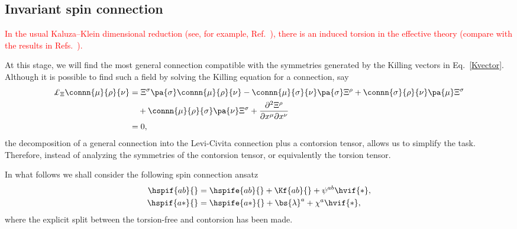 \documentclass[aps,prd,12pt,superscriptaddress,showpacs,showkeys,reprint]{revtex4-1}
\begin{document}
\subsection*{Invariant spin connection}

\textcolor{red}{In the usual Kaluza--Klein dimensional reduction (see, for example, Ref.~\cite{PopeKK}), there is an induced torsion in the effective theory (compare with the results in Refs.~\cite{PhysRevD.17.3141,PhysRevD.19.430}).}

At this stage, we will find the most general connection compatible with the symmetries generated by the Killing vectors in Eq.~\eqref{Kvector}. Although it is possible to find such a field by solving the Killing equation for a connection, say~\cite{Tilquin:2011bu}
\begin{equation}
  \begin{split}
    \pounds_\Xi \connn{\mu}{\rho}{\nu} &= \Xi^\sigma \pa{\sigma} \connn{\mu}{\rho}{\nu} - \connn{\mu}{\sigma}{\nu} \pa{\sigma} \Xi^\rho + \connn{\sigma}{\rho}{\nu} \pa{\mu} \Xi^\sigma \\
    & \quad + \connn{\mu}{\rho}{\sigma} \pa{\nu} \Xi^\sigma + \frac{ \partial^2 \Xi^\rho }{ \partial x^\mu \partial x^\nu} \\
    &= 0,
  \end{split}
\end{equation}
the decomposition of a general connection into the Levi-Civita connection plus a contorsion tensor, allows us to simplify the task. Therefore, instead of analyzing the symmetries of the contorsion tensor, or equivalently the torsion tensor.

In what follows we shall consider the following spin connection ansatz
\begin{equation}
  \label{spif-anz}
  \begin{split}
    \hspif{ab}{} &= \hspife{ab}{} + \Kf{ab}{} + \psi^{ab} \hvif{*}, \\
    \hspif{a*}{} &= \hspife{a*}{} + \bs{\lambda}^a + \chi^a \hvif{*},
  \end{split}
\end{equation}
where the explicit split between the torsion-free and contorsion has been made.
\end{document}

